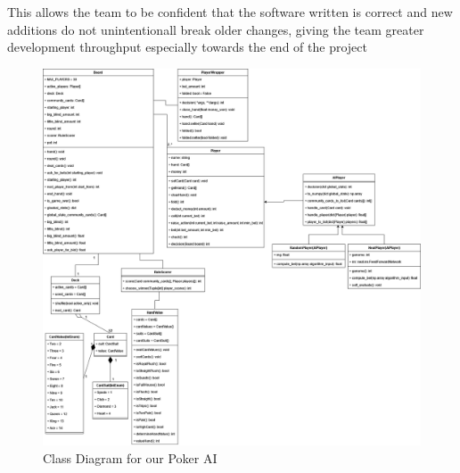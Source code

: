 This allows the team to be confident that the software written is correct and new additions do not
unintentionall break older changes, giving the team greater development throughput especially towards the end
of the project

\clearpage
\begin{figure}[H]
    \centering
    \includegraphics[scale=0.4]{resources/Poker_AI_-Class_Diagram.drawio.png}
    \caption{Class Diagram for our Poker AI}
    \label{fig:classDiagram}
\end{figure}



